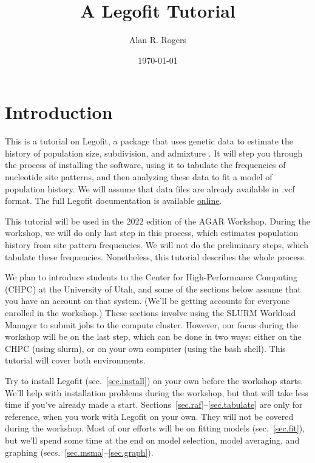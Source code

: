 \documentclass[11pt]{article}
\begin{document}
\title{A Legofit Tutorial}
\author{Alan R. Rogers}
\date{\today}
\maketitle
\tableofcontents

\section{Introduction}
This is a tutorial on Legofit, a package that uses genetic data to
estimate the history of population size, subdivision, and admixture
\citep{Rogers:BMC-20-526, Rogers:PCJ-2-e32}. It will step you through
the process of installing the software, using it to tabulate the
frequencies of nucleotide site patterns, and then analyzing these data
to fit a model of population history. We will assume that data files
are already available in .vcf format. The full Legofit documentation
is available
\href{http://alanrogers.github.io/legofit/html/index.html}{online}.

This tutorial will be used in the 2022 edition of the AGAR
Workshop. During the workshop, we will do only last step in this
process, which estimates population history from site pattern
frequencies. We will not do the preliminary steps, which tabulate
these frequencies. Nonetheless, this tutorial describes the whole
process.

We plan to introduce students to the Center for High-Performance
Computing (CHPC) at the University of Utah, and some of the sections
below assume that you have an account on that system. (We'll be
getting accounts for everyone enrolled in the workshop.) These
sections involve using the SLURM Workload Manager to submit jobs to
the compute cluster. However, our focus during the workshop will be on
the last step, which can be done in two ways: either on the CHPC
(using slurm), or on your own computer (using the bash shell). This
tutorial will cover both environments.

Try to install Legofit (sec.~\ref{sec.install}) on your own before the
workshop starts. We'll help with installation problems during the
workshop, but that will take less time if you've already made a start.
Sections~\ref{sec.raf}--\ref{sec.tabulate} are only for reference,
when you work with Legofit on your own. They will not be covered
during the workshop. Most of our efforts will be on fitting models
(sec.~\ref{sec.fit}), but we'll spend some time at the end on model
selection, model averaging, and graphing
(secs.~\ref{sec.msma}--\ref{sec.graph}).
\end{document}
